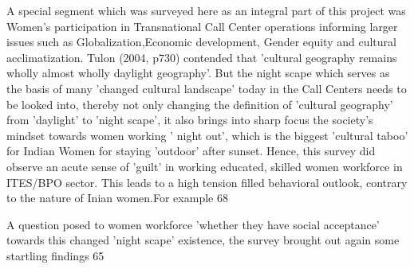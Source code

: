 A special segment which was surveyed here as an integral part of this project was Women's participation in Transnational Call Center operations informing larger issues such as Globalization,Economic development, Gender equity and cultural acclimatization. Tulon (2004, p730) contended that 'cultural geography remains wholly almost wholly daylight geography'. But the night scape which serves as the basis of many 'changed cultural landscape' today in the Call Centers needs to be looked into, thereby not only changing the definition of 'cultural geography' from 'daylight' to 'night scape', it also brings into sharp focus the society's mindset towards women working ' night out', which is the biggest 'cultural taboo' for Indian Women for staying 'outdoor' after sunset. Hence, this survey did observe an  acute sense of 'guilt' in working educated, skilled women workforce in ITES/BPO sector. This leads to a high tension filled behavioral outlook, contrary to the nature of Inian women.For example 68%

A question posed to women workforce 'whether they have social acceptance' towards this changed 'night scape' existence, the survey brought out again some startling findings 65%

